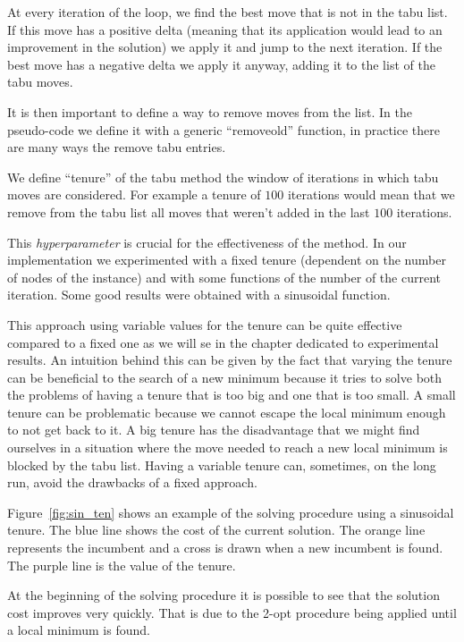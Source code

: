 \documentclass{article}
\begin{document}
At every iteration of the loop, we find the best move that is not in the tabu list. If this move has a positive delta (meaning that its application would lead to an
improvement in the solution) we apply it and jump to the next iteration. If the best
move has a negative delta we apply it anyway, adding it to the list of the tabu moves.

It is then important to define a way to remove moves from the list. In the pseudo-code we define it with a generic ``removeold'' function, in practice there are many ways the remove tabu entries.

We define ``tenure'' of the tabu method the window of iterations in which tabu moves are considered. For example a tenure of $100$ iterations would mean that we remove
from the tabu list all moves that weren't added in the last $100$ iterations.

This \textit{hyperparameter} is crucial for the effectiveness of the method. In our implementation we experimented with a fixed tenure (dependent on the number of
nodes of the instance) and with some functions of the number of the current iteration. Some good results were obtained with a sinusoidal function.

This approach using variable values for the tenure can be quite effective compared to a fixed one as we will se in the chapter dedicated to experimental results.
An intuition behind this can be given by the fact that varying the tenure can be beneficial to the search of a new minimum because it tries to solve both the problems of having a tenure that is too big and one that is too small.
A small tenure can be problematic because we cannot escape the local minimum enough to not get back to it. A big tenure has the disadvantage that we might find ourselves in a situation where the move needed to reach a new local minimum is blocked by the
tabu list. Having a variable tenure can, sometimes, on the long run, avoid the drawbacks of a fixed approach.

Figure~\ref{fig:sin_ten} shows an example of the solving procedure using
a sinusoidal tenure.
The blue line shows the cost of the current solution. The orange line represents
the incumbent and a cross is drawn when a new incumbent is found.
The purple line is the value of the tenure.

At the beginning of the solving procedure it is possible to see that the solution
cost improves very quickly. That is due to the 2-opt procedure being applied
until a local minimum is found.
\end{document}
